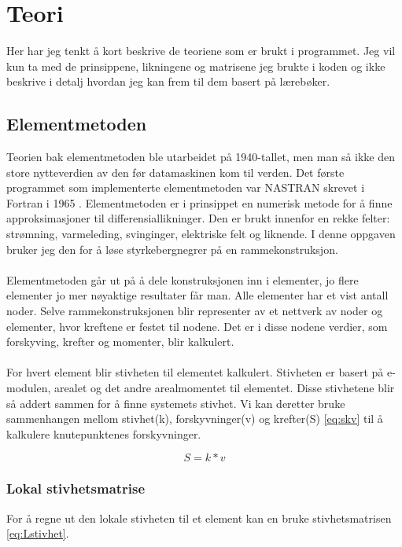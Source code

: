 \documentclass[10pt,a4paper, norsk]{article}
\begin{document}
\section{Teori}

Her har jeg tenkt å kort beskrive de teoriene som er brukt i programmet. Jeg vil kun ta med de prinsippene, likningene og matrisene jeg brukte i koden og ikke beskrive i detalj hvordan jeg kan frem til dem basert på lærebøker. 


\subsection{Elementmetoden}
Teorien bak elementmetoden ble utarbeidet på 1940-tallet, men man så ikke den store nytteverdien av den før datamaskinen kom til verden. Det første programmet som implementerte elementmetoden var NASTRAN skrevet i Fortran i 1965 \cite{wikinastran}.
Elementmetoden er i prinsippet en numerisk metode for å finne approksimasjoner til differensiallikninger. Den er brukt innenfor en rekke felter: strømning, varmeleding, svinginger, elektriske felt og liknende. I denne oppgaven bruker jeg den for å løse styrkebergnegrer på en rammekonstruksjon. 

\paragraph*{}
Elementmetoden går ut på å dele konstruksjonen inn i elementer, jo flere elementer jo mer nøyaktige resultater får man. Alle elementer har et vist antall noder. Selve rammekonstruksjonen blir representer av et nettverk av noder og elementer, hvor kreftene er festet til nodene. Det er i disse nodene verdier, som forskyving, krefter og momenter, blir kalkulert.

\paragraph*{}
For hvert element blir stivheten til elementet kalkulert. Stivheten er basert på e-modulen, arealet og det andre arealmomentet til elementet. Disse stivhetene blir så addert sammen for å finne systemets stivhet. Vi kan deretter bruke sammenhangen mellom stivhet(k), forskyvninger(v) og krefter(S) \eqref{eq:skv} til å kalkulere knutepunktenes forskyvninger.

\begin{equation} \label{eq:skv}
S=k*v
\end{equation}

\subsubsection{Lokal stivhetsmatrise}
For å regne ut den lokale stivheten til et element kan en bruke stivhetsmatrisen \eqref{eq:Lstivhet}. 
\end{document}

